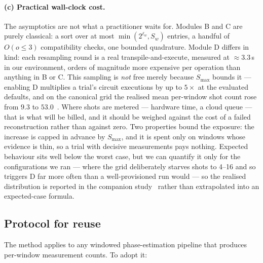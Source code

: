 \documentclass[final,5p,times,longtitle]{elsarticle}
\newcommand{\Smax}{S_{\max}}
\begin{document}
\paragraph{(c) Practical wall-clock cost.} The asymptotics are not what a
practitioner waits for. Modules B and C are purely classical: a sort over
at most $\min(2^{\ell_w},S_w)$ entries, a handful of $O(o\le3)$
compatibility checks, one bounded quadrature. Module D differs in kind:
each resampling round is a real transpile-and-execute, measured at
${\approx}3.3$\,s in our environment, orders of magnitude more expensive
per operation than anything in B or C. This sampling is \emph{not} free
merely because $\Smax$ bounds it --- enabling D multiplies a trial's
circuit executions by up to $5\times$ at the evaluated defaults, and on
the canonical grid the realised mean per-window shot count rose from
$9.3$ to $53.0$~\cite{companion}. Where shots are metered --- hardware time,
a cloud queue --- that is what will be billed, and it should be weighed
against the cost of a failed reconstruction rather than against zero. Two
properties bound the exposure: the increase is capped in advance by
$\Smax$, and it is spent only on windows whose evidence is thin, so a
trial with decisive measurements pays nothing. Expected behaviour sits
well below the worst case, but we can quantify it only for the
configurations we ran --- where the grid deliberately starves shots to
4--16 and so triggers D far more often than a well-provisioned run
would --- so the realised distribution is reported in the companion
study~\cite{companion} rather than extrapolated into an expected-case
formula.

\subsection{Protocol for reuse}
\label{sec:protocol}

The method applies to any windowed phase-estimation pipeline that
produces per-window measurement counts. To adopt it:
\end{document}
